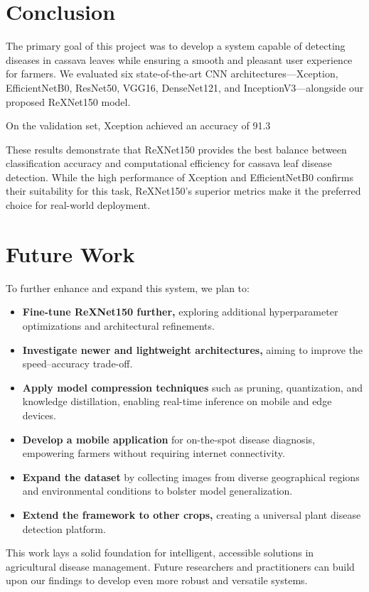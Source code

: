 \section{Conclusion}

The primary goal of this project was to develop a system capable of detecting diseases in cassava leaves while ensuring a smooth and pleasant user experience for farmers. We evaluated six state-of-the-art CNN architectures—Xception, EfficientNetB0, ResNet50, VGG16, DenseNet121, and InceptionV3—alongside our proposed ReXNet150 model. 

On the validation set, Xception achieved an accuracy of 91.3 %

These results demonstrate that ReXNet150 provides the best balance between classification accuracy and computational efficiency for cassava leaf disease detection. While the high performance of Xception and EfficientNetB0 confirms their suitability for this task, ReXNet150’s superior metrics make it the preferred choice for real-world deployment.

\section{Future Work}

To further enhance and expand this system, we plan to:
\begin{itemize}
    \item \textbf{Fine-tune ReXNet150 further,} exploring additional hyperparameter optimizations and architectural refinements.
    \item \textbf{Investigate newer and lightweight architectures,} aiming to improve the speed–accuracy trade-off.
    \item \textbf{Apply model compression techniques} such as pruning, quantization, and knowledge distillation, enabling real-time inference on mobile and edge devices.
    \item \textbf{Develop a mobile application} for on-the-spot disease diagnosis, empowering farmers without requiring internet connectivity.
    \item \textbf{Expand the dataset} by collecting images from diverse geographical regions and environmental conditions to bolster model generalization.
    \item \textbf{Extend the framework to other crops,} creating a universal plant disease detection platform.
\end{itemize}

This work lays a solid foundation for intelligent, accessible solutions in agricultural disease management. Future researchers and practitioners can build upon our findings to develop even more robust and versatile systems.
